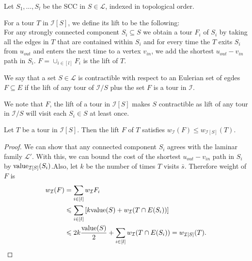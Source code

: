 \documentclass[./main.tex]{subfiles}
\newcommand{\calI}{\ensuremath{\mathcal{I}}}
\newcommand{\calL}{\ensuremath{\mathcal{L}}}
\begin{document}
	Let $S_1, \dots, S_l$ be the SCC in $S \in \calL$, indexed in topological order.
	\begin{definition}\label{def:3:indu-lift}
		For a tour $T$ in $\calI[S]$, we define its lift to be the following:\\
		For any strongly connected component $S_i \subseteq S$ we obtain a tour $F_i$ of $S_i$ by taking all the edges in $T$ that are contained within $S_i$ and for every time the $T$ exits $S_i$ from $u_{out}$ and enters the next time to a vertex $v_{in}$, we add the shortest $u_{out} - v_{in}$ path in $S_i$. $F = \cup_{i \in [l]} F_i$ is the lift of $T$.
	\end{definition}\vspace{2mm}
	\begin{definition}
		We say that a set $S \in \calL$ is contractible with respect to an Eulerian set of egdes $F \subseteq E$ if the lift of any tour of $\calI/S$ plus the set $F$ is a tour in $\calI$.
	\end{definition}\vspace{2mm}
	We note that $F$, the lift of a tour in $\calI[S]$ makes $S$ contractible as lift of any tour in $\calI/S$ will visit each $S_i \in S$ at least once.
		
	\begin{lemma}\label{lemm:3:lift-i}
		Let $T$ be a tour in $\calI[S]$. Then the lift $F$ of $T$ satisfies $w_\calI(F) \leqslant w_{\calI[S]}(T).$
	\end{lemma}
	\begin{proof}
		We can show that any connected component $S_i$ agrees with the laminar family $\calL'$. With this, we can bound the cost of the shortest $u_{out} - v_{in}$ path in $S_i$ by $\val_{\calI[S]}(S_i)$.Also, let $k$ be the number of times $T$ visits $\bar{s}$. Therefore weight of $F$ is
		\begin{align*}
			w_{\calI}(F) &= \sum_{i \in [l]} w_{\calI}F_i\\
			&\leqslant \sum_{i \in [l]} \left[k\val(S) + w_{\calI}(T \cap E(S_i))\right]\\
			&\leqslant 2k \frac{\val(S)}{2} + \sum_{i \in [l]}w_{\calI}(T \cap E(S_i)) = w_{\calI[S]}(T).
		\end{align*}
	\end{proof}
\end{document}
